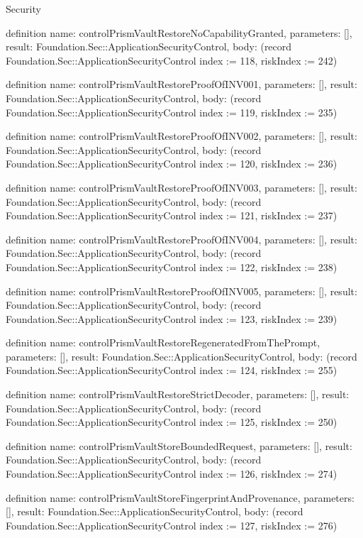 \begin{lexlean}{Security}
\begin{semanticmodule}
definition{
  name: controlPrismVaultRestoreNoCapabilityGranted,
  parameters: [],
  result: Foundation.Sec::ApplicationSecurityControl,
  body: (record Foundation.Sec::ApplicationSecurityControl {index := 118, riskIndex := 242})
}

definition{
  name: controlPrismVaultRestoreProofOfINV001,
  parameters: [],
  result: Foundation.Sec::ApplicationSecurityControl,
  body: (record Foundation.Sec::ApplicationSecurityControl {index := 119, riskIndex := 235})
}

definition{
  name: controlPrismVaultRestoreProofOfINV002,
  parameters: [],
  result: Foundation.Sec::ApplicationSecurityControl,
  body: (record Foundation.Sec::ApplicationSecurityControl {index := 120, riskIndex := 236})
}

definition{
  name: controlPrismVaultRestoreProofOfINV003,
  parameters: [],
  result: Foundation.Sec::ApplicationSecurityControl,
  body: (record Foundation.Sec::ApplicationSecurityControl {index := 121, riskIndex := 237})
}

definition{
  name: controlPrismVaultRestoreProofOfINV004,
  parameters: [],
  result: Foundation.Sec::ApplicationSecurityControl,
  body: (record Foundation.Sec::ApplicationSecurityControl {index := 122, riskIndex := 238})
}

definition{
  name: controlPrismVaultRestoreProofOfINV005,
  parameters: [],
  result: Foundation.Sec::ApplicationSecurityControl,
  body: (record Foundation.Sec::ApplicationSecurityControl {index := 123, riskIndex := 239})
}

definition{
  name: controlPrismVaultRestoreRegeneratedFromThePrompt,
  parameters: [],
  result: Foundation.Sec::ApplicationSecurityControl,
  body: (record Foundation.Sec::ApplicationSecurityControl {index := 124, riskIndex := 255})
}

definition{
  name: controlPrismVaultRestoreStrictDecoder,
  parameters: [],
  result: Foundation.Sec::ApplicationSecurityControl,
  body: (record Foundation.Sec::ApplicationSecurityControl {index := 125, riskIndex := 250})
}

definition{
  name: controlPrismVaultStoreBoundedRequest,
  parameters: [],
  result: Foundation.Sec::ApplicationSecurityControl,
  body: (record Foundation.Sec::ApplicationSecurityControl {index := 126, riskIndex := 274})
}

definition{
  name: controlPrismVaultStoreFingerprintAndProvenance,
  parameters: [],
  result: Foundation.Sec::ApplicationSecurityControl,
  body: (record Foundation.Sec::ApplicationSecurityControl {index := 127, riskIndex := 276})
}


\end{semanticmodule}
\end{lexlean}
